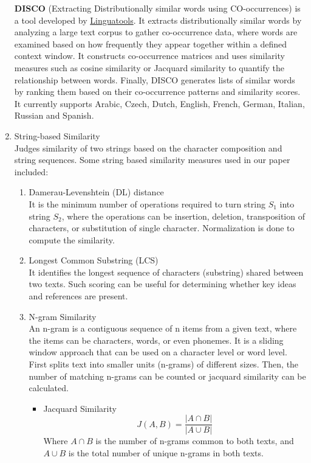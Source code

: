 \documentclass{article}
\begin{document}
\begin{enumerate}
		\textbf{DISCO} (Extracting Distributionally similar words
		using CO-occurrences) is a tool developed by \href{https://www.linguatools.de/disco/disco_en.html}{Linguatools}. It extracts distributionally similar words by analyzing a large text corpus to gather co-occurrence data, where words are examined based on how frequently they appear together within a defined context window. It constructs co-occurrence matrices and uses similarity measures such as cosine similarity or Jacquard similarity to quantify the relationship between words. Finally, DISCO generates lists of similar words by ranking them based on their co-occurrence patterns and similarity scores. It currently supports Arabic, Czech, Dutch, English, French, German, Italian, Russian and Spanish.
		
		\item String-based Similarity \\ Judges similarity of two strings based on the character composition and string sequences. Some string based similarity measures used in our paper included:
		\begin{enumerate}[]
			\item Damerau-Levenshtein (DL) distance \\ It is the minimum number of operations required to turn string $S_1$ into string $S_2$, where the operations can be insertion, deletion, transposition of characters, or substitution of single character. Normalization \cite{1_gomaa2014arabic} is done to compute the similarity.
			\item Longest Common Substring (LCS) \\ It identifies the longest sequence of characters (substring) shared between two texts. Such scoring can be useful for determining whether key ideas and references are present.
			\item N-gram Similarity \\ An n-gram is a contiguous sequence of n items from a given text, where the items can be characters, words, or even phonemes. It is a sliding window approach that can be used on a character level or word level. First splits text into smaller units (n-grams) of different sizes. Then, the number of matching n-grams can be counted or jacquard similarity can be calculated.
			\begin{itemize}
				\item Jacquard Similarity \\ $$J(A,B) = \frac{|A \cap B|}{|A \cup B|}$$ Where $A \cap B$ is the number of n-grams common to both texts, and $A \cup B$ is the total number of unique n-grams in both texts.
			\end{itemize}
		\end{enumerate}
	\end{enumerate}
\end{document}
